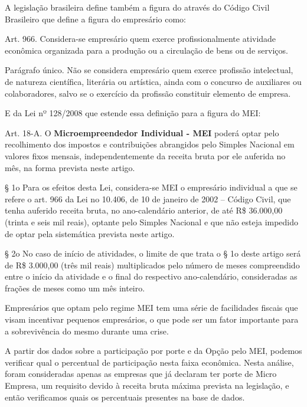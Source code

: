 A legislação brasileira define também a figura do  através do Código Civil Brasileiro \cite{lei:10406:lei-codigo-civil} que define a figura do empresário como:

\begin{citacao}
Art. 966. Considera-se empresário quem exerce profissionalmente atividade econômica organizada para a produção ou a circulação de bens ou de serviços.

Parágrafo único. Não se considera empresário quem exerce profissão intelectual, de natureza científica, literária ou artística, ainda com o concurso de auxiliares ou colaboradores, salvo se o exercício da profissão constituir elemento de empresa.
\end{citacao}

E da Lei nº 128/2008 \cite{lei:128:lei-mei} que estende essa definição para a figura do MEI:

\begin{citacao}
Art. 18-A.  O \textbf{Microempreendedor Individual - MEI} poderá optar pelo recolhimento dos impostos e contribuições abrangidos pelo Simples Nacional em valores fixos mensais, independentemente da receita bruta por ele auferida no mês, na forma prevista neste artigo.

§ 1o  Para os efeitos desta Lei, considera-se MEI o empresário individual a que se refere o art. 966 da Lei no 10.406, de 10 de janeiro de 2002 – Código Civil, que tenha auferido receita bruta, no ano-calendário anterior, de até R\$ 36.000,00 (trinta e seis mil reais), optante pelo Simples Nacional e que não esteja impedido de optar pela sistemática prevista neste artigo.  

§ 2o  No caso de início de atividades, o limite de que trata o § 1o deste artigo será de R\$ 3.000,00 (três mil reais) multiplicados pelo número de meses compreendido entre o início da atividade e o final do respectivo ano-calendário, consideradas as frações de meses como um mês inteiro.  
\end{citacao}

Empresários que optam pelo regime MEI tem uma série de facilidades fiscais que visam incentivar pequenos empresários, o que pode ser um fator importante para a sobrevivência do mesmo durante uma crise.

A partir dos dados sobre a participação por porte e da Opção pelo MEI, podemos verificar qual o percentual de participação nesta faixa econômica. Nesta análise, foram consideradas apenas as empresas que já declaram ter porte de Micro Empresa, um requisito devido à receita bruta máxima prevista na legislação, e então verificamos quais os percentuais presentes na base de dados.

